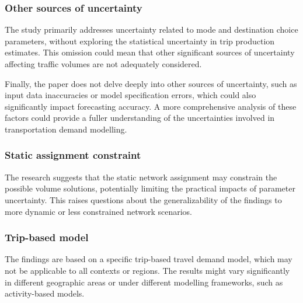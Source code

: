 \documentclass{ar2rc}
\begin{document}
\subsubsection{Other sources of uncertainty}
\RC The study primarily addresses uncertainty related to mode and destination
choice parameters, without exploring the statistical uncertainty in trip
production estimates. This omission could mean that other significant sources
of uncertainty affecting traffic volumes are not adequately considered.

\RC Finally, the paper does not delve deeply into other sources of uncertainty, such
as input data inaccuracies or model specification errors, which could also
significantly impact forecasting accuracy. A more comprehensive analysis of
these factors could provide a fuller understanding of the uncertainties involved
in transportation demand modelling.

\subsubsection{Static assignment constraint}
\RC The research suggests that the static network assignment may constrain the
possible volume solutions, potentially limiting the practical impacts of
parameter uncertainty. This raises questions about the generalizability of the
findings to more dynamic or less constrained network scenarios.

\subsubsection{Trip-based model}
\RC The findings are based on a specific trip-based travel demand model, which
may not be applicable to all contexts or regions. The results might vary
significantly in different geographic areas or under different modelling
frameworks, such as activity-based models.
\end{document}
